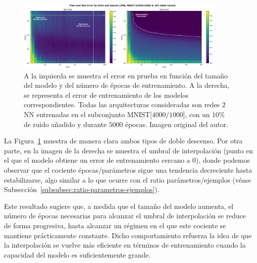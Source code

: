 \begin{figure}[h]
    \centering
    \includegraphics[width=0.9\textwidth]{img/experiments/model-epoch2NNMNIST.png}
    \caption[Doble descenso en función del tamaño del modelo y del número de épocas para la red $2$NN y un subconjunto de MNIST.]{A la izquierda se muestra el error en prueba en función del tamaño del modelo y del número de épocas de entrenamiento. A la derecha, se representa el error de entrenamiento de los modelos correspondientes. Todas las arquitecturas consideradas son redes $2$NN entrenadas en el subconjunto MNIST[$4000/1000$], con un $10\%$ de ruido añadido y durante $5000$ épocas. Imagen original del autor.}\label{fig:model-epoch2NNMNIST}
\end{figure}

La Figura~\ref{fig:model-epoch2NNMNIST} muestra de manera clara ambos tipos de doble descenso. Por otra parte, en la imagen de la derecha se muestra el umbral de interpolación (punto en el que el modelo obtiene un error de entrenamiento cercano a $0$), donde podemos observar que el cociente épocas/parámetros sigue una tendencia decreciente hasta estabilizarse, algo similar a lo que ocurre con el ratio parámetros/ejemplos (véase Subsección~\ref{subsubsec:ratio-parametros-ejemplos}).\newline

Este resultado sugiere que, a medida que el tamaño del modelo aumenta, el número de épocas necesarias para alcanzar el umbral de interpolación se reduce de forma progresiva, hasta alcanzar un régimen en el que este cociente se mantiene prácticamente constante. Dicho comportamiento refuerza la idea de que la interpolación se vuelve más eficiente en términos de entrenamiento cuando la capacidad del modelo es suficientemente grande.\newline

